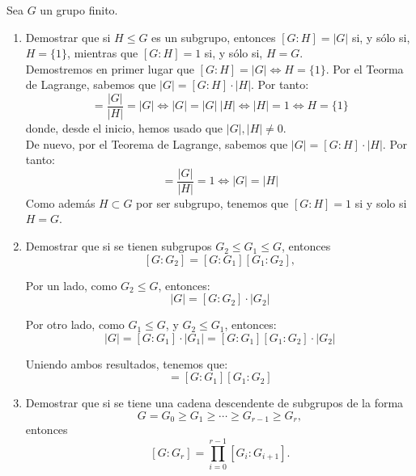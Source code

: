 \begin{ejercicio}\label{ej:3.9}
    Sea $G$ un grupo finito.
    \begin{enumerate}
        \item Demostrar que si $H \leq G$ es un subgrupo, entonces $[G : H] = |G|$ si, y sólo si, $H = \{1\}$, mientras que $[G : H] = 1$ si, y sólo si, $H = G$.\\
        
        Demostremos en primer lugar que $[G:H]=|G|\iff H=\{1\}$. Por el Teorma de Lagrange, sabemos que $|G|=[G:H]\cdot |H|$. Por tanto:
        \begin{equation*}
            [G:H]=\dfrac{|G|}{|H|}=|G|\iff |G|=|G|\ |H|\iff |H|=1\iff H=\{1\}
        \end{equation*}
        donde, desde el inicio, hemos usado que $|G|, |H|\neq 0$.\\

        De nuevo, por el Teorema de Lagrange, sabemos que $|G|=[G:H]\cdot |H|$. Por tanto:
        \begin{equation*}
            [G:H]=\dfrac{|G|}{|H|}=1\iff |G|=|H|
        \end{equation*}
        Como además $H\subset G$ por ser subgrupo, tenemos que $[G:H]=1$ si y solo si $H=G$.
        \item Demostrar que si se tienen subgrupos $G_2 \leq G_1 \leq G$, entonces
        \[
            [G : G_2] = [G : G_1][G_1 : G_2],
        \]
        
        Por un lado, como $G_2\leq G$, entonces:
        \begin{equation*}
            |G|=[G:G_2]\cdot |G_2|
        \end{equation*}

        Por otro lado, como $G_1\leq G$, y $G_2\leq G_1$, entonces:
        \begin{equation*}
            |G|=[G:G_1]\cdot |G_1|=[G:G_1][G_1:G_2]\cdot |G_2|
        \end{equation*}

        Uniendo ambos resultados, tenemos que:
        \begin{equation*}
            [G:G_2]=[G:G_1][G_1:G_2]
        \end{equation*}
        \item Demostrar que si se tiene una cadena descendente de subgrupos de la forma
        \[
            G = G_0 \geq G_1 \geq \cdots \geq G_{r - 1} \geq G_r,
        \]
        entonces
        \[
            [G : G_r] = \prod_{i = 0}^{r - 1}[G_i : G_{i + 1}].
        \]


\end{enumerate}
\end{ejercicio}
